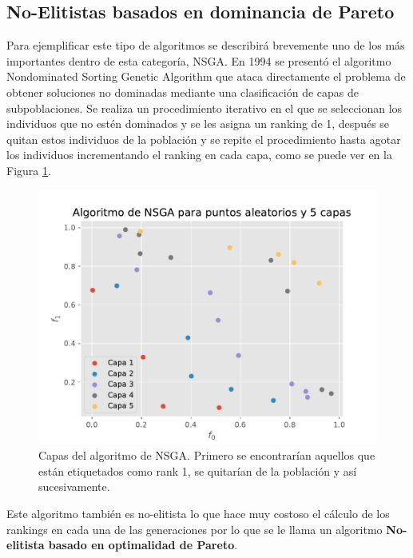 \subsection*{No-Elitistas basados en dominancia de Pareto}

Para ejemplificar este tipo de algoritmos se describirá brevemente uno de los más importantes dentro de esta categoría, NSGA. En 1994 se presentó el algoritmo Nondominated Sorting Genetic Algorithm \cite{srinivasMuiltiobjectiveOptimizationUsing1994} que ataca directamente el problema de obtener soluciones no dominadas mediante una clasificación de capas de subpoblaciones. Se realiza un procedimiento iterativo en el que se seleccionan los individuos que no estén dominados y se les asigna un ranking de 1, después se quitan estos individuos de la población y se repite el procedimiento hasta agotar los individuos incrementando el ranking en cada capa, como se puede ver en la Figura \ref{fig:nsga1}.

\begin{figure}[H]
    \centering
    \includegraphics[width=\textwidth]{Figuras/nds.pdf}
    \caption[NSGA]{Capas del algoritmo de NSGA. Primero se encontrarían aquellos que están etiquetados como rank 1, se quitarían de la población y así sucesivamente.}
    \label{fig:nsga1}
\end{figure}


Este algoritmo también es no-elitista lo que hace muy costoso el cálculo de los rankings en cada una de las generaciones por lo que se le llama un algoritmo \textbf{No-elitista basado en optimalidad de Pareto}.

